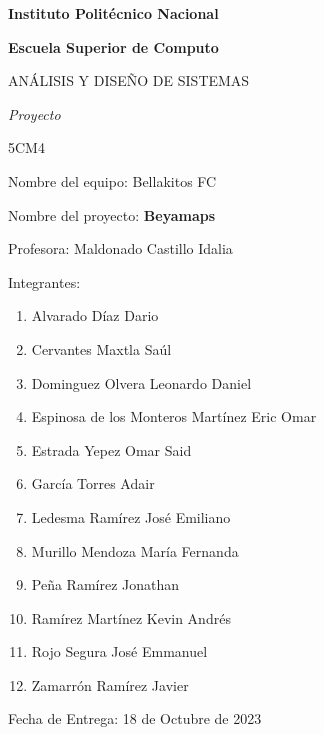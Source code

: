 \documentclass{article}
\begin{document}
\begin{titlepage}
\centering
{\bfseries\LARGE Instituto Politécnico Nacional \par}
\vspace{.5cm}
{\bfseries\LARGE Escuela Superior de Computo \par}
\vspace{1cm}
\Large ANÁLISIS Y DISEÑO DE SISTEMAS \par
\vspace{1cm}
\itshape\LARGE Proyecto \par
\vspace{1cm}
\LARGE 5CM4\par
\vspace{1cm}

\begin{FlushLeft}
\Large Nombre del equipo: Bellakitos FC\par
\Large Nombre del proyecto: \textbf{Beyamaps}\par
\vspace{0.5cm}
\Large Profesora: Maldonado Castillo Idalia	 \par
\vspace{0.5cm}
    Integrantes:\\
    \begin{enumerate}
    \item Alvarado Díaz Dario\\
   \item Cervantes Maxtla Saúl\\
    \item Dominguez Olvera Leonardo Daniel\\
    \item Espinosa de los Monteros Martínez Eric Omar\\
   \item Estrada Yepez Omar Said\\
   \item García Torres Adair\\
   \item Ledesma Ramírez José Emiliano\\
   \item Murillo Mendoza María Fernanda\\
   \item Peña Ramírez Jonathan\\
   \item Ramírez Martínez Kevin Andrés\\
   \item Rojo Segura José Emmanuel\\
   \item Zamarrón Ramírez Javier\\
    \end{enumerate}
\vspace{.5cm}
\Large Fecha de Entrega: 18 de Octubre de 2023 \par
\vspace{.5cm}
\end{FlushLeft}
\end{titlepage}
\tableofcontents
\newpage
\end{document}

